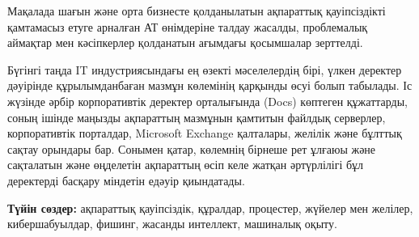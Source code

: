 Мақалада шағын және орта бизнесте қолданылатын ақпараттық қауіпсіздікті
қамтамасыз етуге арналған АТ өнімдеріне талдау жасалды, проблемалық
аймақтар мен кәсіпкерлер қолданатын ағымдағы қосымшалар зерттелді.

Бүгінгі таңда IT индустриясындағы ең өзекті мәселелердің бірі, үлкен
деректер дәуірінде құрылымданбаған мазмұн көлемінің қарқынды өсуі болып
табылады. Іс жүзінде әрбір корпоративтік деректер орталығында (Docs)
көптеген құжаттарды, соның ішінде маңызды ақпараттың мазмұнын қамтитын
файлдық серверлер, корпоративтік порталдар, Microsoft Exchange
қалталары, желілік және бұлттық сақтау орындары бар. Сонымен қатар,
көлемнің бірнеше рет ұлғаюы және сақталатын және өңделетін ақпараттың
өсіп келе жатқан әртүрлілігі бұл деректерді басқару міндетін едәуір
қиындатады.

{\bfseries Түйін сөздер:} ақпараттық қауіпсіздік, құралдар, процестер,
жүйелер мен желілер, кибершабуылдар, фишинг, жасанды интеллект,
машиналық оқыту.


